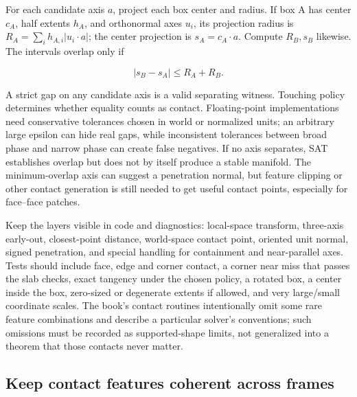 For each candidate axis \(a\), project each box center and radius. If box A has center \(c_A\), half extents \(h_A\), and orthonormal axes \(u_i\), its projection radius is \(R_A=\sum_i h_{A,i}|u_i\cdot a|\); the center projection is \(s_A=c_A\cdot a\). Compute \(R_B,s_B\) likewise. The intervals overlap only if

\[
|s_B-s_A|\le R_A+R_B.
\]

A strict gap on any candidate axis is a valid separating witness. Touching policy determines whether equality counts as contact. Floating-point implementations need conservative tolerances chosen in world or normalized units; an arbitrary large epsilon can hide real gaps, while inconsistent tolerances between broad phase and narrow phase can create false negatives. If no axis separates, SAT establishes overlap but does not by itself produce a stable manifold. The minimum-overlap axis can suggest a penetration normal, but feature clipping or other contact generation is still needed to get useful contact points, especially for face--face patches.

Keep the layers visible in code and diagnostics: local-space transform, three-axis early-out, closest-point distance, world-space contact point, oriented unit normal, signed penetration, and special handling for containment and near-parallel axes. Tests should include face, edge and corner contact, a corner near miss that passes the slab checks, exact tangency under the chosen policy, a rotated box, a center inside the box, zero-sized or degenerate extents if allowed, and very large/small coordinate scales. The book's contact routines intentionally omit some rare feature combinations and describe a particular solver's conventions; such omissions must be recorded as supported-shape limits, not generalized into a theorem that those contacts never matter.

\subsection{Keep contact features coherent across frames}\label{06-engine-ii-ch033-keep-contact-features-coherent-across-frames}

\hypertarget{06-engine-ii-ch033-keep-contact-features-coherent-across-frames}{}

